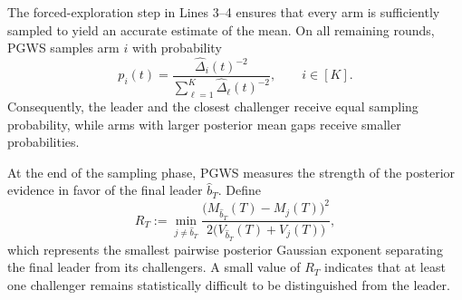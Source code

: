 \documentclass[10pt]{article}
\newcommand{\ouralg}{{\textnormal{\textsc{PGWS}}}}
\theoremstyle{plain}
\begin{document}
The forced-exploration step in Lines 3--4 ensures that every arm is 
 sufficiently sampled to yield an accurate estimate of the mean. 
On all
remaining rounds, 
\ouralg{} samples arm \(i\) with
probability
\begin{equation}
\label{eq:pgws-sampling-prob}
    p_i(t)
    =
    \frac{\widehat\Delta_i(t)^{-2}}
    {\sum_{\ell=1}^K \widehat\Delta_\ell(t)^{-2}},
    \qquad i\in[K].
\end{equation}
Consequently, the leader and the closest
challenger receive equal sampling probability, while arms with larger
posterior mean gaps receive smaller probabilities.

At the end of the sampling phase, \ouralg{} measures the strength of the
posterior evidence in favor of the final leader \(\widehat b_T\). Define
\begin{equation}
\label{eq:pgws-terminal-statistic}
    R_T
    :=
    \min_{j\neq \widehat b_T}
    \frac{
        \bigl(M_{\widehat b_T}(T)-M_j(T)\bigr)^2
    }{
        2\bigl(V_{\widehat b_T}(T)+V_j(T)\bigr)
    },
\end{equation}
which represents the smallest  pairwise posterior Gaussian exponent
separating the final leader from its challengers. A small value of \(R_T\)
indicates that at least one challenger remains statistically difficult
to be distinguished from the leader.
\end{document}
